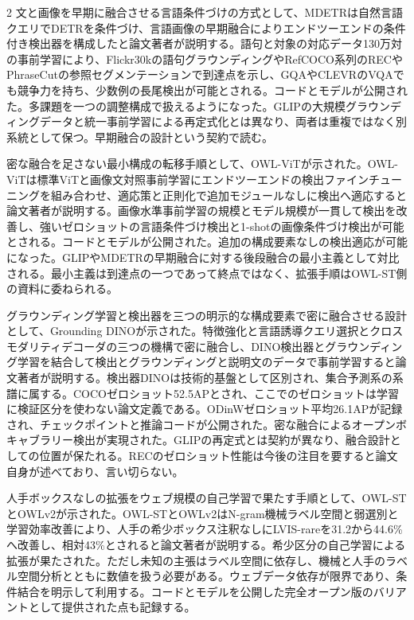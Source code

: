 \documentclass[lualatex,a4paper,10pt]{jlreq}
\begin{document}
\begin{multicols}{2}
\noindent 文と画像を早期に融合させる言語条件づけの方式として、MDETRは自然言語クエリでDETRを条件づけ、言語画像の早期融合によりエンドツーエンドの条件付き検出器を構成したと論文著者が説明する。語句と対象の対応データ130万対の事前学習により、Flickr30kの語句グラウンディングやRefCOCO系列のRECやPhraseCutの参照セグメンテーションで到達点を示し、GQAやCLEVRのVQAでも競争力を持ち、少数例の長尾検出が可能とされる。コードとモデルが公開された。多課題を一つの調整構成で扱えるようになった。GLIPの大規模グラウンディングデータと統一事前学習による再定式化とは異なり、両者は重複ではなく別系統として保つ。早期融合の設計という契約で読む。\autocite{vmd048}\par\medskip
\noindent 密な融合を足さない最小構成の転移手順として、OWL-ViTが示された。OWL-ViTは標準ViTと画像文対照事前学習にエンドツーエンドの検出ファインチューニングを組み合わせ、適応策と正則化で追加モジュールなしに検出へ適応すると論文著者が説明する。画像水準事前学習の規模とモデル規模が一貫して検出を改善し、強いゼロショットの言語条件づけ検出と1-shotの画像条件づけ検出が可能とされる。コードとモデルが公開された。追加の構成要素なしの検出適応が可能になった。GLIPやMDETRの早期融合に対する後段融合の最小主義として対比される。最小主義は到達点の一つであって終点ではなく、拡張手順はOWL-ST側の資料に委ねられる。\autocite{vmd049}\par\medskip
\noindent グラウンディング学習と検出器を三つの明示的な構成要素で密に融合させる設計として、Grounding DINOが示された。特徴強化と言語誘導クエリ選択とクロスモダリティデコーダの三つの機構で密に融合し、DINO検出器とグラウンディング学習を結合して検出とグラウンディングと説明文のデータで事前学習すると論文著者が説明する。検出器DINOは技術的基盤として区別され、集合予測系の系譜に属する。COCOゼロショット52.5APとされ、ここでのゼロショットは学習に検証区分を使わない論文定義である。ODinWゼロショット平均26.1APが記録され、チェックポイントと推論コードが公開された。密な融合によるオープンボキャブラリー検出が実現された。GLIPの再定式とは契約が異なり、融合設計としての位置が保たれる。RECのゼロショット性能は今後の注目を要すると論文自身が述べており、言い切らない。\autocite{vmd050}\par\medskip
\noindent 人手ボックスなしの拡張をウェブ規模の自己学習で果たす手順として、OWL-STとOWLv2が示された。OWL-STとOWLv2はN-gram機械ラベル空間と弱選別と学習効率改善により、人手の希少ボックス注釈なしにLVIS-rareを31.2から44.6\%へ改善し、相対43\%とされると論文著者が説明する。希少区分の自己学習による拡張が果たされた。ただし未知の主張はラベル空間に依存し、機械と人手のラベル空間分析とともに数値を扱う必要がある。ウェブデータ依存が限界であり、条件結合を明示して利用する。コードとモデルを公開した完全オープン版のバリアントとして提供された点も記録する。\autocite{vmd051}\par\medskip

\end{multicols}
\end{document}

